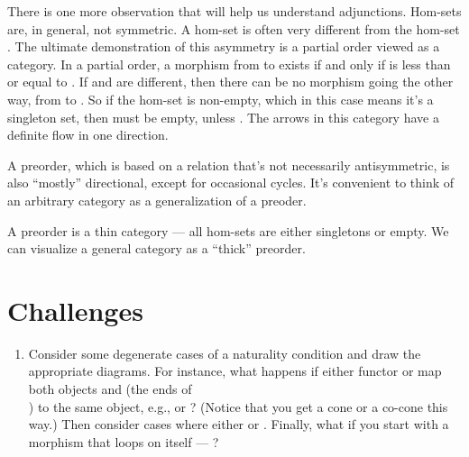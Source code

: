 There is one more observation that will help us understand adjunctions.
Hom-sets are, in general, not symmetric. A hom-set  is
often very different from the hom-set . The ultimate
demonstration of this asymmetry is a partial order viewed as a category.
In a partial order, a morphism from  to  exists if
and only if  is less than or equal to . If
 and  are different, then there can be no morphism
going the other way, from  to . So if the hom-set
 is non-empty, which in this case means it's a
singleton set, then  must be empty, unless
. The arrows in this category have a definite flow in
one direction.

A preorder, which is based on a relation that's not necessarily
antisymmetric, is also ``mostly'' directional, except for occasional
cycles. It's convenient to think of an arbitrary category as a
generalization of a preoder.

A preorder is a thin category --- all hom-sets are either singletons or
empty. We can visualize a general category as a ``thick'' preorder.

\section{Challenges}\label{challenges}

\begin{enumerate}
\tightlist
\item
  Consider some degenerate cases of a naturality condition and draw the
  appropriate diagrams. For instance, what happens if either functor
   or  map both objects  and 
  (the ends of\\ ) to the same
  object, e.g.,  or ?
  (Notice that you get a cone or a co-cone this way.) Then consider
  cases where either  or .
  Finally, what if you start with a morphism that loops on itself ---
  ?
\end{enumerate}